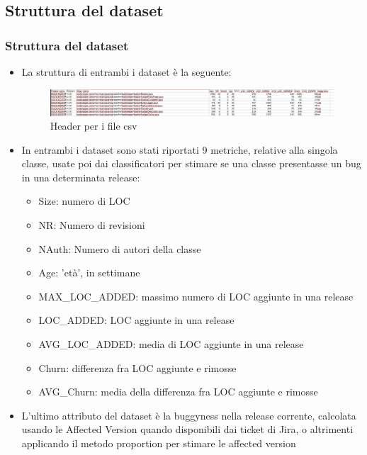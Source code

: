 \documentclass[10pt]{beamer}
\begin{document}
\begin{frame}
\subsection{Struttura del dataset}
\frametitle{Struttura del dataset}
\begin{itemize}
\item La struttura di entrambi i dataset è la seguente:
\begin{figure}
\includegraphics[scale=0.19]{images/csv-header}
\caption{Header per i file csv}
\end{figure}
\item In entrambi i dataset sono stati riportati 9 metriche, relative alla singola classe, usate poi dai classificatori per stimare se una classe presentasse un bug in una determinata release:
\begin{minipage}[t]{0.4\textwidth}
\begin{itemize}
\item Size: numero di LOC 
\item NR: Numero di revisioni
\item NAuth: Numero di autori della classe
\item Age: 'età', in settimane
\item MAX\_LOC\_ADDED: massimo numero di LOC aggiunte in una release
\end{itemize}
\end{minipage}%
\begin{minipage}[t]{0.5\textwidth}
\begin{itemize}
\item LOC\_ADDED: LOC aggiunte in una release
\item AVG\_LOC\_ADDED: media di LOC aggiunte in una release
\item Churn: differenza fra LOC aggiunte e rimosse
\item AVG\_Churn: media della differenza fra LOC aggiunte e rimosse
\end{itemize}
\end{minipage}%
\item L'ultimo  attributo del dataset è la buggyness nella release corrente,  calcolata usando le Affected Version quando disponibili dai ticket di Jira, o altrimenti applicando il metodo proportion per stimare le affected version
\end{itemize} 
\end{frame}
\end{document}
